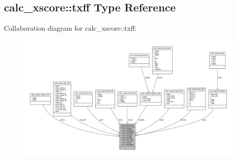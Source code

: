 \hypertarget{structcalc__xscore_1_1txff}{\subsection{calc\-\_\-xscore\-:\-:txff Type Reference}
\label{structcalc__xscore_1_1txff}
}


Collaboration diagram for calc\-\_\-xscore\-:\-:txff\-:
\nopagebreak
\begin{figure}[H]
\begin{center}
\leavevmode
\includegraphics[width=350pt]{structcalc__xscore_1_1txff__coll__graph}
\end{center}
\end{figure}
